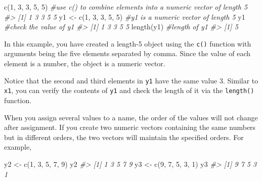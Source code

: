 \documentclass[
]{book}
\newenvironment{Shaded}{\begin{snugshade}}{\end{snugshade}}
\newcommand{\CommentTok}[1]{\textcolor[rgb]{0.56,0.35,0.01}{\textit{#1}}}
\newcommand{\DecValTok}[1]{\textcolor[rgb]{0.00,0.00,0.81}{#1}}
\newcommand{\FunctionTok}[1]{\textcolor[rgb]{0.00,0.00,0.00}{#1}}
\newcommand{\NormalTok}[1]{#1}
\newcommand{\OtherTok}[1]{\textcolor[rgb]{0.56,0.35,0.01}{#1}}
\newenvironment{blackbox}{
  \definecolor{shadecolor}{rgb}{0, 0, 0}  %
  \color{white}
  \begin{shaded}}
 {\end{shaded}}
\newenvironment{infobox}[1]
  {
  \begin{itemize}
  \renewcommand{\labelitemi}{
    \raisebox{-.7\height}[0pt][0pt]{
      {\setkeys{Gin}{width=3em,keepaspectratio}
        \texttt{[image: pics/\#1]}}
    }
  }
  \setlength{\fboxsep}{1em}
  \begin{blackbox}
  \item
  }
  {
  \end{blackbox}
  \end{itemize}
  }
\begin{document}
\begin{Shaded}
\begin{Highlighting}[]
\FunctionTok{c}\NormalTok{(}\DecValTok{1}\NormalTok{, }\DecValTok{3}\NormalTok{, }\DecValTok{3}\NormalTok{, }\DecValTok{5}\NormalTok{, }\DecValTok{5}\NormalTok{)          }\CommentTok{\#use c() to combine elements into a numeric vector of length 5}
\CommentTok{\#\textgreater{} [1] 1 3 3 5 5}
\NormalTok{y1 }\OtherTok{\textless{}{-}} \FunctionTok{c}\NormalTok{(}\DecValTok{1}\NormalTok{, }\DecValTok{3}\NormalTok{, }\DecValTok{3}\NormalTok{, }\DecValTok{5}\NormalTok{, }\DecValTok{5}\NormalTok{)    }\CommentTok{\#y1 is a numeric vector of length 5}
\NormalTok{y1                        }\CommentTok{\#check the value of y1}
\CommentTok{\#\textgreater{} [1] 1 3 3 5 5}
\FunctionTok{length}\NormalTok{(y1)                }\CommentTok{\#length of y1}
\CommentTok{\#\textgreater{} [1] 5}
\end{Highlighting}
\end{Shaded}

In this example, you have created a length-5 object using the \texttt{c()} function with arguments being the five elements separated by comma. Since the value of each element is a number, the object is a numeric vector.

Notice that the second and third elements in \texttt{y1} have the same value 3. Similar to \texttt{x1}, you can verify the contents of \texttt{y1} and check the length of it via the \texttt{length()} function.

\begin{infobox}{caution}

When you assign several values to a name, the order of the values will not change after assignment. If you create two numeric vectors containing the same numbers but in different orders, the two vectors will maintain the specified orders. For example,

\begin{Shaded}
\begin{Highlighting}[]
\NormalTok{y2 }\OtherTok{\textless{}{-}} \FunctionTok{c}\NormalTok{(}\DecValTok{1}\NormalTok{, }\DecValTok{3}\NormalTok{, }\DecValTok{5}\NormalTok{, }\DecValTok{7}\NormalTok{, }\DecValTok{9}\NormalTok{)    }
\NormalTok{y2                        }
\CommentTok{\#\textgreater{} [1] 1 3 5 7 9}
\NormalTok{y3 }\OtherTok{\textless{}{-}} \FunctionTok{c}\NormalTok{(}\DecValTok{9}\NormalTok{, }\DecValTok{7}\NormalTok{, }\DecValTok{5}\NormalTok{, }\DecValTok{3}\NormalTok{, }\DecValTok{1}\NormalTok{)    }
\NormalTok{y3}
\CommentTok{\#\textgreater{} [1] 9 7 5 3 1}
\end{Highlighting}
\end{Shaded}

\end{infobox}
\end{document}
